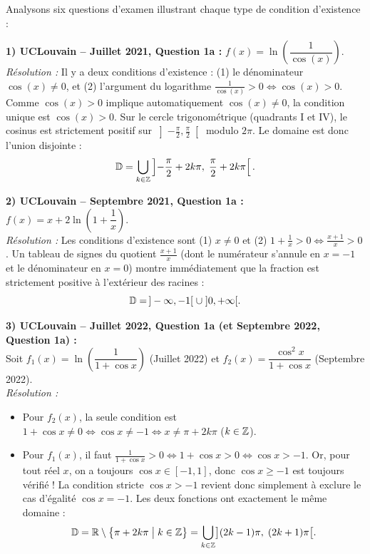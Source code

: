 \begin{exemple}
Analysons six questions d'examen illustrant chaque type de condition d'existence :

\medskip
\textbf{1) UCLouvain -- Juillet 2021, Question 1a :} $f(x) = \ln\left(\dfrac{1}{\cos(x)}\right)$.\\
\emph{Résolution :} Il y a deux conditions d'existence : (1) le dénominateur $\cos(x) \neq 0$, et (2) l'argument du logarithme $\frac{1}{\cos(x)} > 0 \iff \cos(x) > 0$. Comme $\cos(x) > 0$ implique automatiquement $\cos(x) \neq 0$, la condition unique est $\cos(x) > 0$. Sur le cercle trigonométrique (quadrants I et IV), le cosinus est strictement positif sur $\left]-\frac{\pi}{2}, \frac{\pi}{2}\right[$ modulo $2\pi$. Le domaine est donc l'union disjointe :
\[
    \mathbb{D} = \bigcup_{k \in \mathbb{Z}} \left]-\frac{\pi}{2} + 2k\pi,\; \frac{\pi}{2} + 2k\pi\right[.
\]

\medskip
\textbf{2) UCLouvain -- Septembre 2021, Question 1a :} $f(x) = x + 2\ln\left(1 + \dfrac{1}{x}\right)$.\\
\emph{Résolution :} Les conditions d'existence sont (1) $x \neq 0$ et (2) $1 + \frac{1}{x} > 0 \iff \frac{x+1}{x} > 0$. Un tableau de signes du quotient $\frac{x+1}{x}$ (dont le numérateur s'annule en $x=-1$ et le dénominateur en $x=0$) montre immédiatement que la fraction est strictement positive à l'extérieur des racines :
\[
    \mathbb{D} = \,]-\infty, -1[ \;\cup\; ]0, +\infty[.
\]

\medskip
\textbf{3) UCLouvain -- Juillet 2022, Question 1a (et Septembre 2022, Question 1a) :}\\
Soit $f_1(x) = \ln\left(\dfrac{1}{1+\cos x}\right)$ (Juillet 2022) et $f_2(x) = \dfrac{\cos^2 x}{1 + \cos x}$ (Septembre 2022).\\
\emph{Résolution :}
\begin{itemize}
    \item Pour $f_2(x)$, la seule condition est $1 + \cos x \neq 0 \iff \cos x \neq -1 \iff x \neq \pi + 2k\pi$ ($k \in \mathbb{Z}$).
    \item Pour $f_1(x)$, il faut $\frac{1}{1+\cos x} > 0 \iff 1 + \cos x > 0 \iff \cos x > -1$. Or, pour tout réel $x$, on a toujours $\cos x \in [-1, 1]$, donc $\cos x \ge -1$ est toujours vérifié ! La condition stricte $\cos x > -1$ revient donc simplement à exclure le cas d'égalité $\cos x = -1$. Les deux fonctions ont exactement le même domaine :
    \[
        \mathbb{D} = \mathbb{R} \setminus \bigl\{ \pi + 2k\pi \;\big|\; k \in \mathbb{Z} \bigr\} = \bigcup_{k \in \mathbb{Z}} \bigl](2k-1)\pi,\; (2k+1)\pi\bigr[.
    \]
\end{itemize}


\end{exemple}
